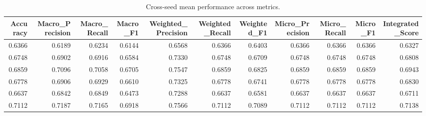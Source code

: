 \begin{table}[t]
\centering
\begin{tabular}{rrrrrrrrrrr}
\toprule
Accuracy & Macro_Precision & Macro_Recall & Macro_F1 & Weighted_Precision & Weighted_Recall & Weighted_F1 & Micro_Precision & Micro_Recall & Micro_F1 & Integrated_Score \\
\midrule
0.6366 & 0.6189 & 0.6234 & 0.6144 & 0.6568 & 0.6366 & 0.6403 & 0.6366 & 0.6366 & 0.6366 & 0.6327 \\
0.6748 & 0.6902 & 0.6916 & 0.6584 & 0.7330 & 0.6748 & 0.6709 & 0.6748 & 0.6748 & 0.6748 & 0.6808 \\
0.6859 & 0.7096 & 0.7058 & 0.6705 & 0.7547 & 0.6859 & 0.6825 & 0.6859 & 0.6859 & 0.6859 & 0.6943 \\
0.6778 & 0.6906 & 0.6929 & 0.6610 & 0.7325 & 0.6778 & 0.6741 & 0.6778 & 0.6778 & 0.6778 & 0.6830 \\
0.6637 & 0.6842 & 0.6849 & 0.6473 & 0.7288 & 0.6637 & 0.6581 & 0.6637 & 0.6637 & 0.6637 & 0.6711 \\
0.7112 & 0.7187 & 0.7165 & 0.6918 & 0.7566 & 0.7112 & 0.7089 & 0.7112 & 0.7112 & 0.7112 & 0.7138 \\
\bottomrule
\end{tabular}
\caption{Cross-seed mean performance across metrics.}
\label{tab:cross_seed_mean}
\end{table}
